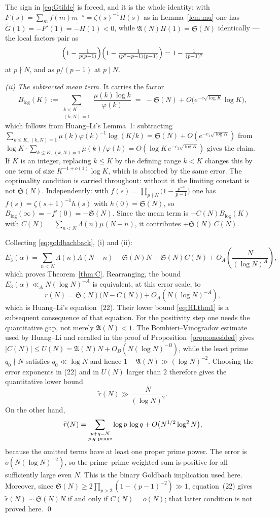 \documentclass[11pt,a4paper]{article}
\theoremstyle{plain}
\theoremstyle{definition}
\theoremstyle{remark}
\renewcommand{\SS}{\mathfrak{S}}
\newcommand{\AAA}{\mathfrak{A}}
\begin{document}
The sign in \eqref{eq:Gtilde} is forced, and it is the whole identity:
with $F(s)=\sum_m f(m)m^{-s}=\zeta(s)^{-1}H(s)$ as in
Lemma~\ref{lem:mu} one has $\widetilde G(1)=-F'(1)=-H(1)<0$, while
$\AAA(N)H(1)=\SS(N)$ identically --- the local factors pair as
\[
  \Bigl(1-\tfrac{1}{p(p-1)}\Bigr)
  \Bigl(1-\tfrac{1}{(p^2-p-1)(p-1)}\Bigr)
  =1-\tfrac{1}{(p-1)^2}
\]
at $p\nmid N$, and as $p/(p-1)$ at $p\mid N$.

\medskip\noindent
\emph{(ii) The subtracted mean term.} It carries the factor
\[
  B_{\log}(K):=\sum_{\substack{k<K\\ (k,N)=1}}
     \frac{\mu(k)\log k}{\varphi(k)}
  \;=\;-\SS(N)+O\bigl(e^{-c\sqrt{\log K}}\log K\bigr),
\]
which follows from Huang--Li's Lemma~1: subtracting
$\sum_{k\le K,\,(k,N)=1}\mu(k)\varphi(k)^{-1}\log(K/k)
 =\SS(N)+O(e^{-c_1\sqrt{\log K}})$ from
$\log K\cdot\sum_{k\le K,\,(k,N)=1}\mu(k)/\varphi(k)
 =O(\log K\,e^{-c_1\sqrt{\log K}})$ gives the claim.  If $K$
is an integer, replacing $k\le K$ by the defining range $k<K$ changes
this by one term of size $K^{-1+o(1)}\log K$, which is absorbed by the
same error. The coprimality
condition is carried throughout: without it the limiting constant is
not $\SS(N)$. Independently:
with $f(s)=\prod_{p\nmid N}\bigl(1-\frac{p^{-s}}{p-1}\bigr)$ one has
$f(s)=\zeta(s+1)^{-1}h(s)$ with $h(0)=\SS(N)$, so
$B_{\log}(\infty)=-f'(0)=-\SS(N)$. Since the mean term is
$-C(N)B_{\log}(K)$ with $C(N)=\sum_{n<N}\Lambda(n)\mu(N-n)$, it
contributes $+\SS(N)\,C(N)$.

\medskip
Collecting \eqref{eq:goldbachback}, (i) and (ii):
\[
  E_3(\alpha)=\sum_{n<N}\Lambda(n)\Lambda(N-n)
    -\SS(N)N+\SS(N)C(N)+O_A\!\left(\frac{N}{(\log N)^{A}}\right),
\]
which proves Theorem~\ref{thm:C}.  Rearranging, the bound
$E_3(\alpha)\ll_A N(\log N)^{-A}$ is equivalent, at this error scale, to
\[
  \tilde r(N)=\SS(N)\bigl(N-C(N)\bigr)+O_A\!\left(N(\log N)^{-A}\right),
\]
which is Huang--Li's equation~(22).  Their lower bound
\eqref{eq:HLthm1} is a subsequent consequence of that equation.  For the positivity step one needs the quantitative gap, not merely
$\AAA(N)<1$.  The Bombieri--Vinogradov estimate used by Huang--Li and
recalled in the proof of Proposition~\ref{prop:onesided} gives
$|C(N)|\le U(N)=\AAA(N)N+O_B(N(\log N)^{-B})$, while the least prime
$q_0\nmid N$ satisfies $q_0\ll\log N$ and hence
$1-\AAA(N)\gg(\log N)^{-2}$.  Choosing the error exponents in (22) and in $U(N)$ larger than $2$
therefore gives the quantitative lower bound
\[
 \widetilde r(N)\gg \frac{N}{(\log N)^2}.
\]
On the other hand,
\[
 \widetilde r(N)=
 \sum_{\substack{p+q=N\\ p,q\ {\rm prime}}}\log p\,\log q
 +O\bigl(N^{1/2}\log^2N\bigr),
\]
because the omitted terms have at least one proper prime power.  The
error is $o(N(\log N)^{-2})$, so the prime--prime weighted sum is
positive for all sufficiently large even $N$.  This is the binary
Goldbach implication used here.  Moreover, since
$\SS(N)\ge2\prod_{p>2}(1-(p-1)^{-2})\gg1$, equation~(22) gives
$\tilde r(N)\sim\SS(N)N$ if and only if $C(N)=o(N)$; that latter
condition is not proved here. \qed
\end{document}
